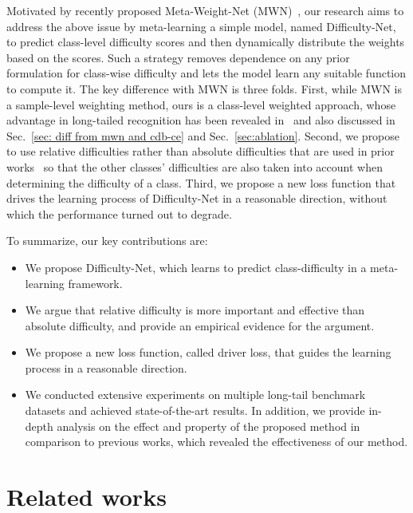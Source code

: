 \documentclass[10pt,twocolumn,letterpaper]{article}
\begin{document}
Motivated by recently proposed Meta-Weight-Net (MWN)~\cite{meta-weight-net}, our research aims to address the above issue by meta-learning a simple model, named Difficulty-Net, to predict class-level difficulty scores and then dynamically distribute the weights based on the scores.
Such a strategy removes dependence on any prior formulation for class-wise difficulty and lets the model learn any suitable function to compute it.
The key difference with MWN is three folds.
First, while MWN is a sample-level weighting method, ours is a class-level weighted approach, whose advantage in long-tailed recognition has been revealed in~\cite{cdb-ce} and also discussed in Sec.~\ref{sec: diff from mwn and cdb-ce} and Sec.~\ref{sec:ablation}. 
Second, we propose to use relative difficulties rather than absolute difficulties that are used in prior works~\cite{meta-weight-net,cdb-ce} so that the other classes' difficulties are also taken into account when determining the difficulty of a class.
Third, we propose a new loss function that drives the learning process of Difficulty-Net in a reasonable direction, without which the performance turned out to degrade.





To summarize, our key contributions are:
\vspace{-5pt}
\begin{itemize}\itemsep0em
    \item We propose Difficulty-Net, which learns to predict class-difficulty in a meta-learning framework.
    \item We argue that relative difficulty is more important and effective than absolute difficulty, and provide an empirical evidence for the argument.
    \item We propose a new loss function, called driver loss, that guides the learning process in a reasonable direction.
\item We conducted extensive experiments on multiple long-tail benchmark datasets and achieved state-of-the-art results. In addition, we provide in-depth analysis on the effect and property of the proposed method in comparison to previous works, which revealed the effectiveness of our method.
\end{itemize}




\section{Related works}\label{sec:related works}
\end{document}
